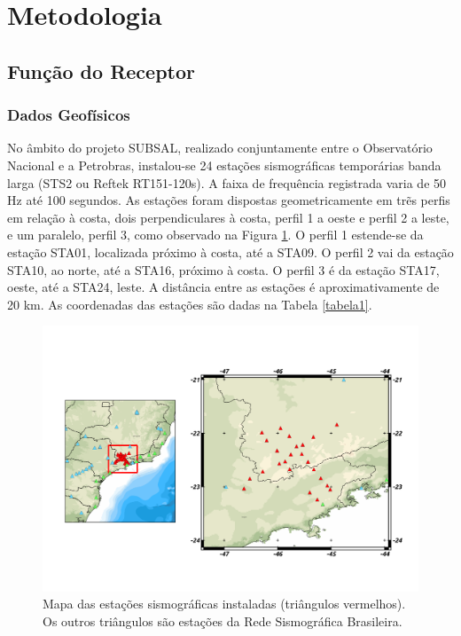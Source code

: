 \chapter*{Metodologia}

\section*{Função do Receptor}
\subsection*{Dados Geofísicos}

No âmbito do projeto SUBSAL, realizado conjuntamente entre o Observatório Nacional e a Petrobras,  instalou-se 24 estações sismográficas temporárias banda larga (STS2 ou Reftek RT151-120s). A faixa de frequência registrada varia de 50 Hz até 100 segundos.  As estações foram dispostas geometricamente em trẽs perfis em relação à costa, dois perpendiculares à costa, perfil 1 a oeste e perfil 2 a leste, e um paralelo, perfil 3, como observado na Figura \ref{figura1}. O perfil 1 estende-se da estação STA01, localizada próximo à costa, até a STA09. O perfil 2 vai da estação STA10, ao norte, até a STA16, próximo à costa. O perfil 3 é da estação STA17, oeste, até a STA24, leste. A distância entre as estações é aproximativamente de 20 km. As coordenadas das estações são dadas na Tabela \ref{tabela1}. 

\begin{figure}[!ht]
\centering
\includegraphics[scale=1]{mapa_das_estacoes_simosgraficas_instaladas.png}
\caption{Mapa das estações sismográficas instaladas (triângulos vermelhos). Os outros triângulos são estações da Rede Sismográfica Brasileira.}
\label{figura1}
\end{figure}

